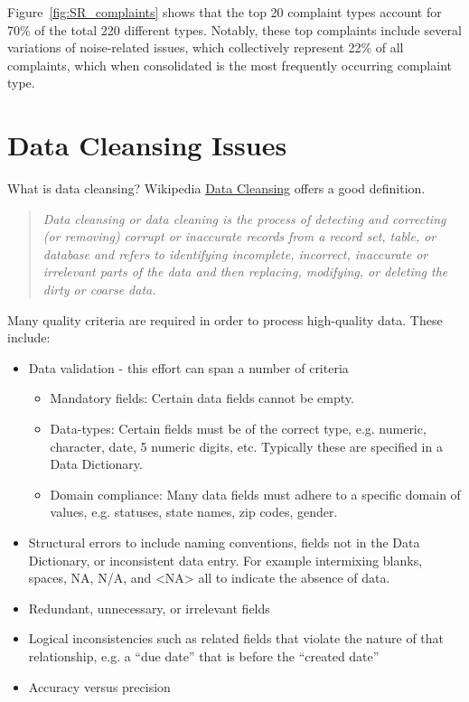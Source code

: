 \documentclass[12pt, titlepage]{article}
\begin{document}
Figure~\ref{fig:SR_complaints} shows that the top 20 complaint 
types account for 70\% of the total 220 different types. Notably, 
these top complaints include several variations of noise-related 
issues, which collectively represent 22\% of all complaints, which
when consolidated is the most frequently occurring complaint type.


\section{Data Cleansing Issues} 
\label{sec:issues}
What is data cleansing?  Wikipedia 
\href{https://en.wikipedia.org/wiki/Data_cleansing}{Data Cleansing} offers a good definition. 

\begin{quote}\textit{Data cleansing or data cleaning is the process of detecting and 
correcting (or removing) corrupt or inaccurate records from a record set, 
table, or database and refers to identifying incomplete, incorrect, 
inaccurate or irrelevant parts of the data and then replacing, 
modifying, or deleting the dirty or coarse data.}
\end{quote}

Many quality criteria are required in order to process high-quality 
data. These include:

\begin{itemize}
	\item Data validation - this effort can span a number of criteria
	\begin{itemize}
		\item Mandatory fields: Certain data fields cannot be empty.
		\item Data-types: Certain fields must be of the correct type, e.g. numeric, 
		character, date, 5 numeric digits, etc. Typically these are specified 
		in a Data Dictionary.
		\item Domain compliance:  Many data fields must adhere to a specific 
		domain of values, e.g. statuses, state names, zip codes, gender. 
	\end{itemize}   
	\item Structural errors to include naming conventions, 
	 fields not in the Data Dictionary, or inconsistent data entry. For example 
	 intermixing blanks, spaces, NA, N/A, and \textless{}NA\textgreater{} 
	 all to indicate the absence of data.
	\item Redundant, unnecessary, or irrelevant fields
	\item Logical inconsistencies such as related fields that violate the 
	nature of that relationship, e.g. a ``due date'' that is before the ``created date''
	\item Accuracy versus precision
\end{itemize}
\end{document}
